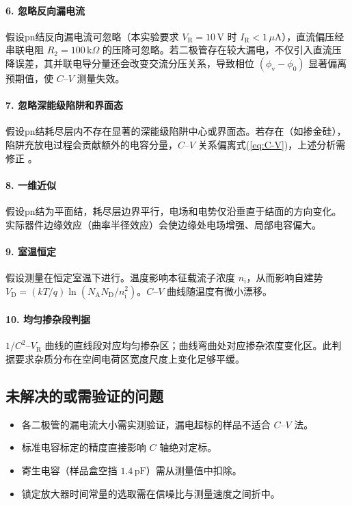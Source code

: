 \paragraph{6. 忽略反向漏电流}
假设pn结反向漏电流可忽略（本实验要求 $V_{\mathrm{R}} = 10\,\mathrm{V}$ 时 $I_{\mathrm{R}} < 1\,\mu\mathrm{A}$），直流偏压经串联电阻 $R_{2} = 100\,\mathrm{k}\Omega$ 的压降可忽略。若二极管存在较大漏电，不仅引入直流压降误差，其并联电导分量还会改变交流分压关系，导致相位 $(\phi_{\mathrm{v}} - \phi_{0})$ 显著偏离预期值，使 $C$--$V$ 测量失效。

\paragraph{7. 忽略深能级陷阱和界面态}
假设pn结耗尽层内不存在显著的深能级陷阱中心或界面态。若存在（如掺金硅），陷阱充放电过程会贡献额外的电容分量，$C$--$V$ 关系偏离式(\ref{eq:C-V})，上述分析需修正 \cite{Schibli1968}。

\paragraph{8. 一维近似}
假设pn结为平面结，耗尽层边界平行，电场和电势仅沿垂直于结面的方向变化。实际器件边缘效应（曲率半径效应）会使边缘处电场增强、局部电容偏大。

\paragraph{9. 室温恒定}
假设测量在恒定室温下进行。温度影响本征载流子浓度 $n_{\mathrm{i}}$，从而影响自建势 $V_{\mathrm{D}} = (kT/q)\ln(N_{\mathrm{A}}N_{\mathrm{D}}/n_{\mathrm{i}}^{2})$。$C$--$V$ 曲线随温度有微小漂移。

\paragraph{10. 均匀掺杂段判据}
$1/C^{2}$--$V_{\mathrm{R}}$ 曲线的直线段对应均匀掺杂区；曲线弯曲处对应掺杂浓度变化区。此判据要求杂质分布在空间电荷区宽度尺度上变化足够平缓。


\subsection*{未解决的或需验证的问题}

\begin{itemize}
  \item 各二极管的漏电流大小需实测验证，漏电超标的样品不适合 $C$--$V$ 法。
  \item 标准电容标定的精度直接影响 $C$ 轴绝对定标。
  \item 寄生电容（样品盒空挡 $1.4\,\mathrm{pF}$）需从测量值中扣除。
  \item 锁定放大器时间常量的选取需在信噪比与测量速度之间折中。
\end{itemize}
